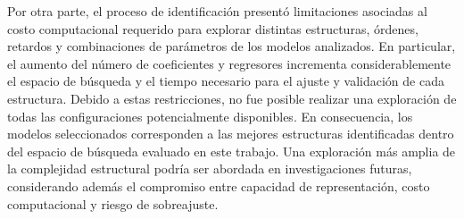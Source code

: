 \documentclass[11pt]{report}
\begin{document}
Por otra parte, el proceso de identificación presentó limitaciones asociadas al costo computacional requerido para explorar distintas estructuras, órdenes, retardos y combinaciones de parámetros de los modelos analizados. En particular, el aumento del número de coeficientes y regresores incrementa considerablemente el espacio de búsqueda y el tiempo necesario para el ajuste y validación de cada estructura. Debido a estas restricciones, no fue posible realizar una exploración de todas las configuraciones potencialmente disponibles. En consecuencia, los modelos seleccionados corresponden a las mejores estructuras identificadas dentro del espacio de búsqueda evaluado en este trabajo. Una exploración más amplia de la complejidad estructural podría ser abordada en investigaciones futuras, considerando además el compromiso entre capacidad de representación, costo computacional y riesgo de sobreajuste.  
\end{document}
